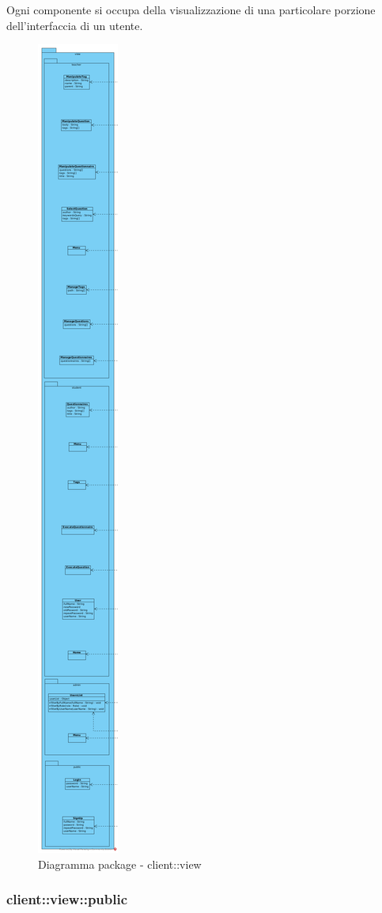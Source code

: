 Ogni componente si occupa della visualizzazione di una particolare porzione dell'interfaccia di un utente.\begin{center}
		\begin{figure}[H]
			\centering \includegraphics[scale=4, max width=\textwidth, max height=\myheight]{../img/diagrammiClassi/client/view.png}
			\caption{Diagramma package - client::view}
		\end{figure}
	\end{center}\subsubsection{client::view::public}
